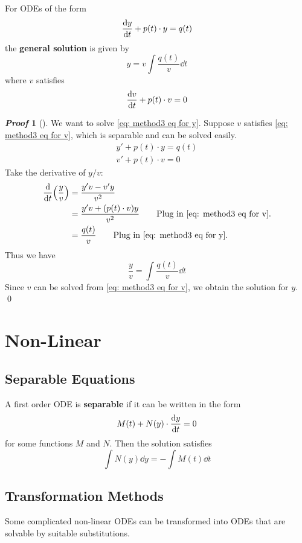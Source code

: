 \documentclass[10pt,UTF8]{article}
\newenvironment{theoremBox}
{
  \begin{tcolorbox}[colback=yellow!5!white,colframe=yellow!75!black,parbox=false,before
  upper=\par,before lower=\par]}
  {
\end{tcolorbox}}
\theoremstyle{definition}
\newtheorem{definition inner}{Definition}[section]
\theoremstyle{definition}
\newtheorem{theorem inner}{Theorem}[section]
\theoremstyle{definition}
\newtheorem*{proof inner}{\textit{Proof}}
\renewenvironment{proof}[1][]
{
\begin{proof inner}[#1]\hfill\par}
  {\qed\vphantom{.}
\end{proof inner}}
\theoremstyle{plain}
\newtheorem{tip inner}{Tip}[section]
\theoremstyle{remark}
\begin{document}
\begin{theoremBox}
  For ODEs of the form
  \[
    \dv{y}{t} + p(t)\cdot y = q(t)
  \]
  the \textbf{general solution} is given by
  \[
    y = v \int \frac{q(t)}{v} \dd{t}
  \]
  where \(v\) satisfies
  \[
    \dv{v}{t} + p(t)\cdot v = 0
  \]
\end{theoremBox}
\begin{proof}
  We want to solve \cref{eq: method3 eq for y}.
  Suppose \(v\) satisfies \cref{eq: method3 eq for v},
  which is separable and can be solved easily.
  \begin{gather}
    y' + p(t)\cdot y = q(t)
    \label{eq: method3 eq for y} \\
    v' + p(t)\cdot v = 0
    \label{eq: method3 eq for v}
  \end{gather}
  Take the derivative of \(y/v\):
  \begin{align*}
    \dv{t}(\frac{y}{v})
    &= \frac{y' v - v' y}{v^2} \\
    &= \frac{y' v + (p(t)\cdot v) y}{v^2}
    \tag*{Plug in \cref{eq: method3 eq for v}.} \\
    &= \frac{q(t)}{v}
    \tag*{Plug in \cref{eq: method3 eq for y}.}
  \end{align*}
  Thus we have
  \begin{equation*}
    \frac{y}{v} = \int \frac{q(t)}{v} \dd{t}
  \end{equation*}
  Since \(v\) can be solved from \cref{eq: method3 eq for v},
  we obtain the solution for \(y\).
\end{proof}

\section{Non-Linear}

\subsection{Separable Equations}

A first order ODE is \textbf{separable} if it can be written in the form
\[
  M(t) + N(y)\cdot \dv{y}{t} = 0
\]
for some functions \(M\) and \(N\).
Then the solution satisfies
\[
  \int N(y)\dd{y} = -\int M(t)\dd{t}
\]

\subsection{Transformation Methods}

Some complicated non-linear ODEs can be transformed into ODEs that
are solvable by suitable substitutions.
\end{document}
